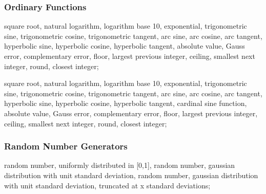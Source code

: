 \subsubsection{Ordinary Functions}
\label{subsubsec:function}
\begin{5.02.05}
\begin{madlist}
   square root, 
    natural logarithm, 
   logarithm base 10, 
   exponential, 
   trigonometric sine, 
   trigonometric cosine, 
   trigonometric tangent, 
   arc sine, 
   arc cosine, 
   arc tangent, 
   hyperbolic sine, 
   hyperbolic cosine, 
   hyperbolic tangent, 
   absolute value, 
   Gauss error,
   complementary error,
   floor, largest previous integer,
   ceiling, smallest next integer,
   round, closest integer;
\end{madlist}
\end{5.02.05}

\begin{5.02.06}
\begin{madlist}
	 square root, 
	  natural logarithm, 
	 logarithm base 10, 
	 exponential, 
	 trigonometric sine, 
	 trigonometric cosine, 
	 trigonometric tangent, 
	 arc sine, 
	 arc cosine, 
	 arc tangent, 
	 hyperbolic sine, 
	 hyperbolic cosine, 
	 hyperbolic tangent, 
	 cardinal sine function,
	 absolute value, 
	 Gauss error,
	 complementary error,
	 floor, largest previous integer,
	 ceiling, smallest next integer,
	 round, closest integer;
\end{madlist}
\end{5.02.06}

\subsubsection{Random Number Generators}
\label{subsubsec:random}
\begin{madlist}
   random number, uniformly distributed in [0,1], 
   random number, gaussian distribution with unit
  standard deviation,  
   random number, gaussian distribution with unit
  standard deviation, truncated at x standard deviations;  
\end{madlist}

